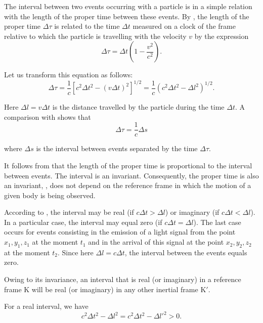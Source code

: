 The interval between two events occurring with a particle is in a simple relation with the length of the proper time between these events. By , the length of the proper time $\Delta\tau$ is related to the time $\Delta t$ measured on a clock of the frame relative to which the particle is travelling with the velocity $v$ by the expression
\begin{equation*}
	\Delta\tau = \Delta t\left(1 - \frac{v^2}{c^2}\right).
\end{equation*}

\noindent
Let us transform this equation as follows:
\begin{equation*}
	\Delta\tau = \frac{1}{c}\left[c^2\Delta t^2 - (v\Delta t)^2\right]^{1/2} = \frac{1}{c}\left(c^2\Delta t^2 - \Delta l^2\right)^{1/2}.
\end{equation*}

\noindent
Here $\Delta l=v\Delta t$ is the distance travelled by the particle during the time $\Delta t$. A comparison with  shows that
\begin{equation}\label{eq:8_25}
	\Delta\tau = \frac{1}{c}\Delta s
\end{equation}

\noindent
where $\Delta s$ is the interval between events separated by the time $\Delta\tau$.

It follows from  that the length of the proper time is proportional to the interval between events. The interval is an invariant. Consequently, the proper time is also an invariant, \ie, does not depend on the reference frame in which the motion of a given body is being observed.

According to , the interval may be real (if $c\Delta t>\Delta l$) or imaginary (if $c\Delta t<\Delta l$). In a particular case, the interval may equal zero (if $c\Delta t=\Delta l$). The last case occurs for events consisting in the emission of a light signal from the point $x_1, y_1, z_1$ at the moment $t_1$ and in the arrival of this signal at the point $x_2, y_2, z_2$ at the moment $t_2$. Since here $\Delta l=c\Delta t$, the interval between the events equals zero.

Owing to its invariance, an interval that is real (or imaginary) in a reference frame K will be real (or imaginary) in any other inertial frame K$'$.

For a real interval, we have
\begin{equation*}
	c^2\Delta t^2 - \Delta l^2 = c^2\Delta t^2 - \Delta l'^2 > 0.
\end{equation*}

